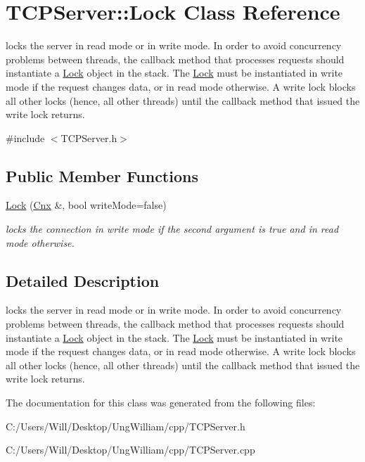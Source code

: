 \hypertarget{class_t_c_p_server_1_1_lock}{}\section{T\+C\+P\+Server\+:\+:Lock Class Reference}
\label{class_t_c_p_server_1_1_lock}


locks the server in read mode or in write mode. In order to avoid concurrency problems between threads, the callback method that processes requests should instantiate a \hyperlink{class_t_c_p_server_1_1_lock}{Lock} object in the stack. The \hyperlink{class_t_c_p_server_1_1_lock}{Lock} must be instantiated in write mode if the request changes data, or in read mode otherwise. A write lock blocks all other locks (hence, all other threads) until the callback method that issued the write lock returns.  




{\ttfamily \#include $<$T\+C\+P\+Server.\+h$>$}

\subsection*{Public Member Functions}
\begin{DoxyCompactItemize}
\item 
\hyperlink{class_t_c_p_server_1_1_lock_a4b1fa591dde407aacd93133828cfac81}{Lock} (\hyperlink{class_t_c_p_server_1_1_cnx}{Cnx} \&, bool write\+Mode=false)\hypertarget{class_t_c_p_server_1_1_lock_a4b1fa591dde407aacd93133828cfac81}{}\label{class_t_c_p_server_1_1_lock_a4b1fa591dde407aacd93133828cfac81}

\begin{DoxyCompactList}\small\item\em locks the connection in write mode if the second argument is true and in read mode otherwise. \end{DoxyCompactList}\end{DoxyCompactItemize}


\subsection{Detailed Description}
locks the server in read mode or in write mode. In order to avoid concurrency problems between threads, the callback method that processes requests should instantiate a \hyperlink{class_t_c_p_server_1_1_lock}{Lock} object in the stack. The \hyperlink{class_t_c_p_server_1_1_lock}{Lock} must be instantiated in write mode if the request changes data, or in read mode otherwise. A write lock blocks all other locks (hence, all other threads) until the callback method that issued the write lock returns. 

The documentation for this class was generated from the following files\+:\begin{DoxyCompactItemize}
\item 
C\+:/\+Users/\+Will/\+Desktop/\+Ung\+William/cpp/T\+C\+P\+Server.\+h\item 
C\+:/\+Users/\+Will/\+Desktop/\+Ung\+William/cpp/T\+C\+P\+Server.\+cpp\end{DoxyCompactItemize}
